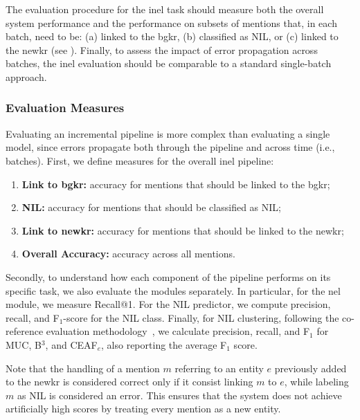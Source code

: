 The evaluation procedure for the \ac{inel} task should measure both the overall system performance and the performance on subsets of mentions that, in each batch, need to be: (a) linked to the \ac{bgkr}, (b) classified as NIL, or (c) linked to the \ac{newkr} (see ).  
%
Finally, to assess the impact of error propagation across batches, the \ac{inel} evaluation should be comparable to a standard single-batch approach.

\subsubsection{Evaluation Measures} \label{sec:evaluation2}

Evaluating an incremental pipeline is more complex than evaluating a single model, since errors propagate both through the pipeline and across time (i.e., batches).
%
First, we define measures for the overall \ac{inel} pipeline:  

\begin{enumerate}[leftmargin=*, label=(\alph*), ref=(\alph*)]
    \item \textbf{Link to \ac{bgkr}:} accuracy for mentions that should be linked to the \ac{bgkr};
    \item \textbf{NIL:} accuracy for mentions that should be classified as NIL;
    \item \textbf{Link to \ac{newkr}:} accuracy for mentions that should be linked to the \ac{newkr};
    \item \textbf{Overall Accuracy:} accuracy across all mentions.
\end{enumerate}

Secondly, to understand how each component of the pipeline performs on its specific task, we also evaluate the modules separately. In particular, for the \ac{nel} module, we measure Recall@1. For the NIL predictor, we compute precision, recall, and F$_1$-score for the NIL class. Finally, for NIL clustering, following the co-reference evaluation methodology~\cite{streaming_crossdoc_coreference}, we calculate precision, recall, and F$_1$ for MUC, B$^3$, and CEAF$_e$, also reporting the average F$_1$ score.


Note that the handling of a mention $m$ referring to an entity $e$ previously added to the \ac{newkr} is considered correct only if it consist linking $m$ to $e$, while labeling $m$ as NIL is considered an error. This ensures that the system does not achieve artificially high scores by treating every mention as a new entity.

